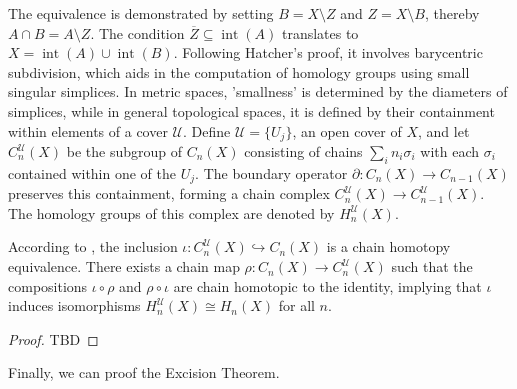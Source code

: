 The equivalence is demonstrated by setting \( B = X \setminus Z \) and \( Z = X \setminus B \), thereby \( A \cap B = A \setminus Z \). The condition \( \overline{Z} \subseteq \operatorname{int}(A) \) translates to \( X = \operatorname{int}(A) \cup \operatorname{int}(B) \). Following Hatcher's proof, it involves barycentric subdivision, which aids in the computation of homology groups using small singular simplices. In metric spaces, 'smallness' is determined by the diameters of simplices, while in general topological spaces, it is defined by their containment within elements of a cover \( \mathcal{U} \). Define \( \mathcal{U} = \{U_{j}\} \), an open cover of \( X \), and let \( C^{\mathcal{U}}_{n}(X) \) be the subgroup of \( C_{n}(X) \) consisting of chains \( \sum_{i} n_{i} \sigma_{i} \) with each \( \sigma_{i} \) contained within one of the \( U_{j} \). The boundary operator \( \partial: C_{n}(X) \to C_{n-1}(X) \) preserves this containment, forming a chain complex \( C^{\mathcal{U}}_{n}(X) \to C^{\mathcal{U}}_{n-1}(X) \). The homology groups of this complex are denoted by \( H^{\mathcal{U}}_{n}(X) \).

\begin{proposition}
According to \cite[\S 2.21]{hatcher2005algebraic}, the inclusion \( \iota : C^{\mathcal{U}}_n(X) \hookrightarrow C_n(X) \) is a chain homotopy equivalence. There exists a chain map \( \rho : C_n(X) \to C^{\mathcal{U}}_n(X) \) such that the compositions \( \iota \circ \rho \) and \( \rho \circ \iota \) are chain homotopic to the identity, implying that \( \iota \) induces isomorphisms \( H^{\mathcal{U}}_n(X) \cong H_n(X) \) for all \( n \).
\end{proposition}

\begin{proof}
TBD
\end{proof}

Finally, we can proof the Excision Theorem.

